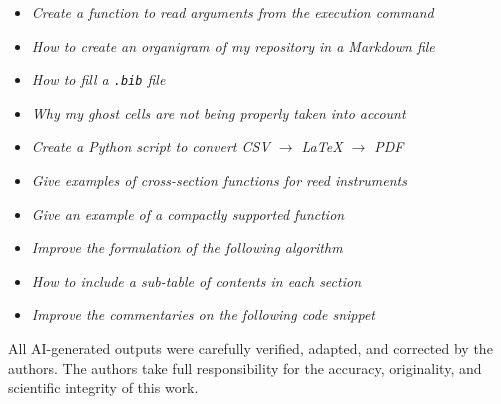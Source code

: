 \documentclass[11pt,a4paper]{report}
\theoremstyle{plain}
\theoremstyle{definition}
\begin{document}
\begin{itemize}
    \item \textit{Create a function to read arguments from the execution command}
    \item \textit{How to create an organigram of my repository in a Markdown file}
    \item \textit{How to fill a \texttt{.bib} file}
    \item \textit{Why my ghost cells are not being properly taken into account}
    \item \textit{Create a Python script to convert CSV $\rightarrow$ \LaTeX{} $\rightarrow$ PDF}
    \item \textit{Give examples of cross-section functions for reed instruments}
    \item \textit{Give an example of a compactly supported function}
    \item \textit{Improve the formulation of the following algorithm}
    \item \textit{How to include a sub-table of contents in each section}
    \item \textit{Improve the commentaries on the following code snippet}
\end{itemize}

All AI-generated outputs were carefully verified, adapted, and corrected by the authors.  
The authors take full responsibility for the accuracy, originality, and scientific integrity of this work.

\newpage
\printbibliography

%
\end{document}
